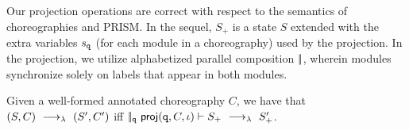 \smallskip

 Our projection operations are correct with
respect to the semantics of choreographies and PRISM. In the sequel,
$S_+$ is a state $S$ extended with the extra variables $s_{\mathtt{q}}$
(for each module in a choreography) used by the projection. In the
projection, we utilize alphabetized parallel composition $|\!|$,
wherein modules synchronize solely on labels that appear in both
modules.
\begin{theorem}[EPP]\label{thm:epp}
  Given a well-formed annotated choreography $C$, we have that
  $(S,C) \ \longrightarrow_{\lambda}\  (S', C')$ iff
  $|\!|_{\mathtt{q}}\ \mathsf{proj} (\mathtt{q}, C,\iota)\vdash S_{+}
  \ \longrightarrow_{\lambda}\  S_{+}'$.
\end{theorem}
